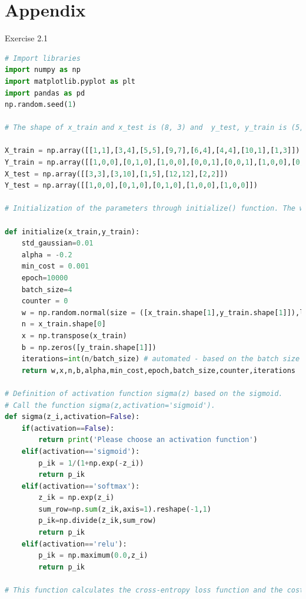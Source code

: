 \documentclass{article}
\begin{document}
\newpage

\section{Appendix}
Exercise 2.1 
\begin{lstlisting}[language=Python]
# Import libraries
import numpy as np
import matplotlib.pyplot as plt
import pandas as pd
np.random.seed(1)

# The shape of x_train and x_test is (8, 3) and  y_test, y_train is (5,). Each vector has two features x1,x2 that belongs to one of 3 classes using the (hot encoding) [1,0,0][0,1,0] and [0,0,1] approximation. If x1=x2 [1,0,0], x1<x2 [0,1,0] and x1>x2 [0,0,1].

X_train = np.array([[1,1],[3,4],[5,5],[9,7],[6,4],[4,4],[10,1],[1,3]]) 
Y_train = np.array([[1,0,0],[0,1,0],[1,0,0],[0,0,1],[0,0,1],[1,0,0],[0,0,1],[0,1,0]])
X_test = np.array([[3,3],[3,10],[1,5],[12,12],[2,2]])
Y_test = np.array([[1,0,0],[0,1,0],[0,1,0],[1,0,0],[1,0,0]])

# Initialization of the parameters through initialize() function. The weights were chosen randomly using a normal distribution with gaussians with standard deviation of 0.01 and the initial offset was set to b = 0. loc = mean of the normal distribution, size = shape of the output, scale = standard deviation

def initialize(x_train,y_train):
    std_gaussian=0.01
    alpha = -0.2
    min_cost = 0.001
    epoch=10000
    batch_size=4
    counter = 0
    w = np.random.normal(size = ([x_train.shape[1],y_train.shape[1]]),loc=0,scale=std_gaussian) 
    n = x_train.shape[0]
    x = np.transpose(x_train)
    b = np.zeros([y_train.shape[1]])
    iterations=int(n/batch_size) # automated - based on the batch size
    return w,x,n,b,alpha,min_cost,epoch,batch_size,counter,iterations

# Definition of activation function sigma(z) based on the sigmoid. 
# Call the function sigma(z,activation='sigmoid'). 
def sigma(z_i,activation=False):
    if(activation==False):
        return print('Please choose an activation function')
    elif(activation=='sigmoid'):
        p_ik = 1/(1+np.exp(-z_i))
        return p_ik
    elif(activation=='softmax'):
        z_ik = np.exp(z_i)
        sum_row=np.sum(z_ik,axis=1).reshape(-1,1)
        p_ik=np.divide(z_ik,sum_row)
        return p_ik
    elif(activation=='relu'):
        p_ik = np.maximum(0.0,z_i)
        return p_ik

# This function calculates the cross-entropy loss function and the cost function. Instead of using for-loops element-wise operations are performed with arrays. Call the function : cost_function(y_train,p_i,loss_function='cross_entropy')


\end{lstlisting}
\end{document}
